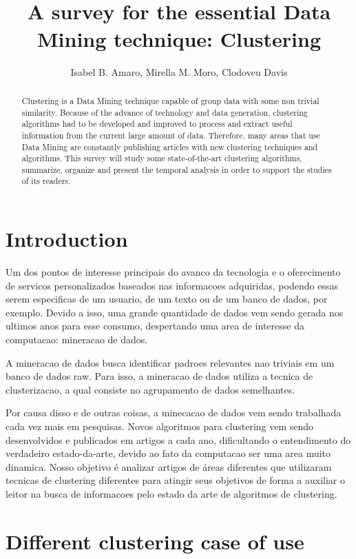 \documentclass[12pt]{article}
\title{\\ A survey for the essential Data Mining technique: Clustering}
\author{Isabel B. Amaro\inst{1}, Mirella M. Moro\inst{2}, Clodoveu Davis\inst{3}}
\begin{document}
 

\maketitle

\begin{abstract}
Clustering is a Data Mining technique capable of group data with some non trivial similarity. Because of the advance of technology and data generation, clustering algorithms had to be developed and improved to process and extract useful information from the current large amount of data. Therefore, many areas that use Data Mining are constantly publishing articles with new clustering techniques and algorithms. This survey will study some state-of-the-art clustering algorithms, summarize, organize and present the temporal analysis in order to support the studies of its readers.
\end{abstract}

\section{Introduction}

\hspace{6ex} Um dos pontos de interesse principais do avanco da tecnologia e o oferecimento de servicos personalizados baseados nas informacoes adquiridas, podendo essas serem especificas de um usuario, de um texto ou de um banco de dados, por exemplo. Devido a isso, uma grande quantidade de dados vem sendo gerada nos ultimos anos para esse consumo, despertando uma area de interesse da computacao: mineracao de dados.

A mineracao de dados busca identificar padroes relevantes nao triviais em um banco de dados raw. Para isso, a mineracao de dados utiliza a tecnica de clusterizacao, a qual consiste no agrupamento de dados semelhantes.

Por causa disso e de outras coisas, a minecacao de dados vem sendo trabalhada cada vez mais em pesquisas. Novos algoritmos para clustering vem sendo desenvolvidos e publicados em artigos a cada ano, dificultando o entendimento do verdadeiro estado-da-arte, devido ao fato da computacao ser uma area muito dinamica. Nosso objetivo é analizar artigos de áreas diferentes que utilizaram tecnicas de clustering diferentes para atingir seus objetivos de forma a auxiliar o leitor na busca de informacoes pelo estado da arte de algoritmos de clustering.

\section{Different clustering case of use}
\end{document}
